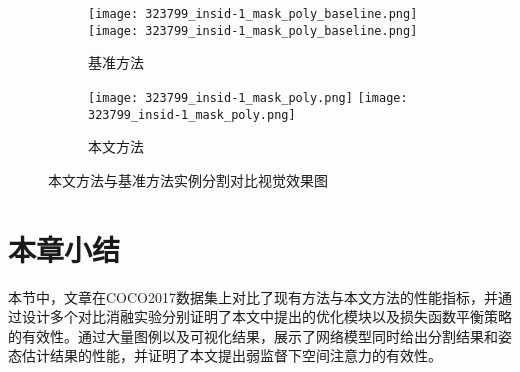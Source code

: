 \begin{figure}[H]
\begin{minipage}{\linewidth}
		\vskip5pt
		\begin{subfigure}[b]{0.45\linewidth}
			\begin{minipage}{\linewidth}
				\centering
				\texttt{[image: 323799\_insid-1\_mask\_poly\_baseline.png]}
				{\texttt{[image: 323799\_insid-1\_mask\_poly\_baseline.png]}}
			\end{minipage}	
			\caption{基准方法\cite{He2017Mask}}
		\end{subfigure}
		\begin{subfigure}[b]{0.45\linewidth}
			\begin{minipage}{\linewidth}
				\centering
				\texttt{[image: 323799\_insid-1\_mask\_poly.png]}
				{\texttt{[image: 323799\_insid-1\_mask\_poly.png]}}
			\end{minipage}	
			\caption{本文方法}
		\end{subfigure}
	\end{minipage}
	\caption{本文方法与基准方法实例分割对比视觉效果图}
	\label{fig:comparison_mask}
\end{figure}


\section{本章小结}
本节中，文章在COCO2017数据集上对比了现有方法与本文方法的性能指标，并通过设计多个对比消融实验分别证明了本文中提出的优化模块以及损失函数平衡策略的有效性。通过大量图例以及可视化结果，展示了网络模型同时给出分割结果和姿态估计结果的性能，并证明了本文提出弱监督下空间注意力的有效性。
